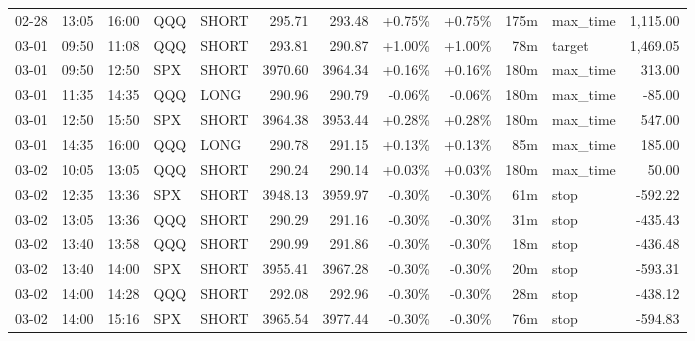 \documentclass[11pt,a4paper,twoside]{article}
\begin{document}
\begin{center}
\begin{longtable}{>{\color{txtmain}}l l l l l r r r r r >{\color{txtmain}}l r}
02-28 & 13:05 & 16:00 & QQQ & SHORT & 295.71 & 293.48 & \textcolor{wingreen}{+0.75\%} & \textcolor{wingreen}{+0.75\%} & 175m & max\_time & \textcolor{wingreen}{1,115.00} \\
03-01 & 09:50 & 11:08 & QQQ & SHORT & 293.81 & 290.87 & \textcolor{wingreen}{+1.00\%} & \textcolor{wingreen}{+1.00\%} & 78m & target & \textcolor{wingreen}{1,469.05} \\
03-01 & 09:50 & 12:50 & SPX & SHORT & 3970.60 & 3964.34 & \textcolor{wingreen}{+0.16\%} & \textcolor{wingreen}{+0.16\%} & 180m & max\_time & \textcolor{wingreen}{313.00} \\
03-01 & 11:35 & 14:35 & QQQ & LONG & 290.96 & 290.79 & \textcolor{lossred}{-0.06\%} & \textcolor{lossred}{-0.06\%} & 180m & max\_time & \textcolor{lossred}{-85.00} \\
03-01 & 12:50 & 15:50 & SPX & SHORT & 3964.38 & 3953.44 & \textcolor{wingreen}{+0.28\%} & \textcolor{wingreen}{+0.28\%} & 180m & max\_time & \textcolor{wingreen}{547.00} \\
03-01 & 14:35 & 16:00 & QQQ & LONG & 290.78 & 291.15 & \textcolor{wingreen}{+0.13\%} & \textcolor{wingreen}{+0.13\%} & 85m & max\_time & \textcolor{wingreen}{185.00} \\
03-02 & 10:05 & 13:05 & QQQ & SHORT & 290.24 & 290.14 & \textcolor{wingreen}{+0.03\%} & \textcolor{wingreen}{+0.03\%} & 180m & max\_time & \textcolor{wingreen}{50.00} \\
03-02 & 12:35 & 13:36 & SPX & SHORT & 3948.13 & 3959.97 & \textcolor{lossred}{-0.30\%} & \textcolor{lossred}{-0.30\%} & 61m & stop & \textcolor{lossred}{-592.22} \\
03-02 & 13:05 & 13:36 & QQQ & SHORT & 290.29 & 291.16 & \textcolor{lossred}{-0.30\%} & \textcolor{lossred}{-0.30\%} & 31m & stop & \textcolor{lossred}{-435.43} \\
03-02 & 13:40 & 13:58 & QQQ & SHORT & 290.99 & 291.86 & \textcolor{lossred}{-0.30\%} & \textcolor{lossred}{-0.30\%} & 18m & stop & \textcolor{lossred}{-436.48} \\
03-02 & 13:40 & 14:00 & SPX & SHORT & 3955.41 & 3967.28 & \textcolor{lossred}{-0.30\%} & \textcolor{lossred}{-0.30\%} & 20m & stop & \textcolor{lossred}{-593.31} \\
03-02 & 14:00 & 14:28 & QQQ & SHORT & 292.08 & 292.96 & \textcolor{lossred}{-0.30\%} & \textcolor{lossred}{-0.30\%} & 28m & stop & \textcolor{lossred}{-438.12} \\
03-02 & 14:00 & 15:16 & SPX & SHORT & 3965.54 & 3977.44 & \textcolor{lossred}{-0.30\%} & \textcolor{lossred}{-0.30\%} & 76m & stop & \textcolor{lossred}{-594.83} \\

\end{longtable}
\end{center}
\end{document}
